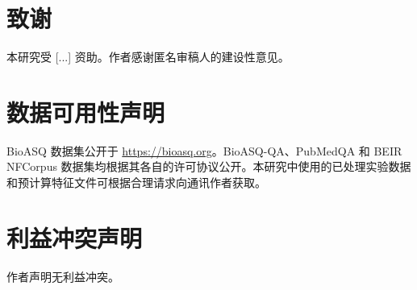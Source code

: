 \documentclass[UTF8,11pt]{ctexart}
\begin{document}
\section*{致谢}
本研究受 [...] 资助。作者感谢匿名审稿人的建设性意见。

\section*{数据可用性声明}
BioASQ 数据集公开于 \url{https://bioasq.org}。BioASQ-QA、PubMedQA 和 BEIR NFCorpus 数据集均根据其各自的许可协议公开。本研究中使用的已处理实验数据和预计算特征文件可根据合理请求向通讯作者获取。

\section*{利益冲突声明}
作者声明无利益冲突。

\appendix




\end{document}
